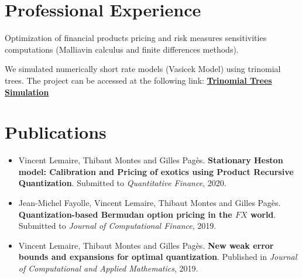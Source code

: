 \documentclass[]{deedy-resume-openfont}
\begin{document}
\begin{minipage}[t]{0.66\textwidth}
	\vspace{\topsep}
	\vspace{\topsep}
	\section{Professional Experience}


	Optimization of financial products pricing and risk measures sensitivities computations (Malliavin calculus and finite differences methods).
	\sectionsep

	We simulated numerically short rate models (Vasicek Model) using trinomial trees. The project can be accessed at the following link: \href{http://simulations.lpsm.paris/trinomial_trees/}{\bf Trinomial Trees Simulation}
	\sectionsep


	\vspace{\topsep}

	\section{Publications}

	\begin{itemize}
		\item Vincent Lemaire, Thibaut Montes and Gilles Pagès. \textbf{Stationary Heston model: Calibration and Pricing of exotics using Product Recursive Quantization}. Submitted to \textit{Quantitative Finance}, 2020.
		\item Jean-Michel Fayolle, Vincent Lemaire, Thibaut Montes and Gilles Pagès. \textbf{Quantization-based Bermudan option pricing in the $FX$ world}. Submitted to \textit{Journal of Computational Finance}, 2019.
		\item Vincent Lemaire, Thibaut Montes and Gilles Pagès. \textbf{New weak error bounds and expansions for optimal quantization}. Published in \textit{Journal of Computational and Applied Mathematics}, 2019.
	\end{itemize}

	\vspace{-1.cm}
	\renewcommand\refname{\vskip -1.5em} %
	
	
	\nocite{*}


\end{minipage}
%
% 
% 
\end{document}
